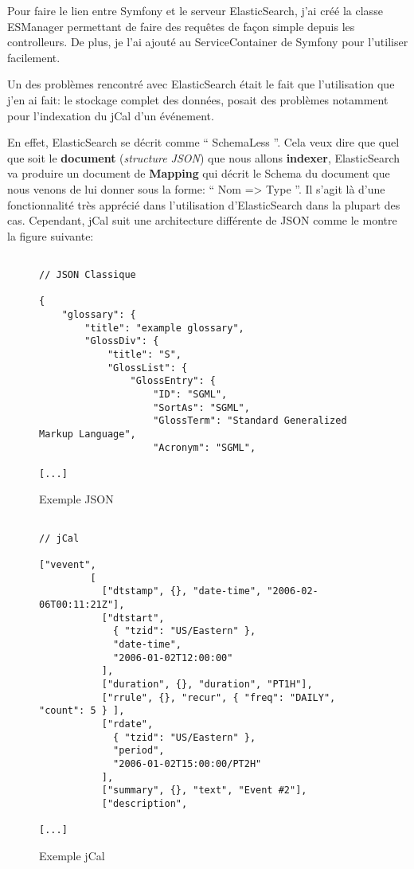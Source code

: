 Pour faire le lien entre Symfony et le serveur ElasticSearch, j'ai créé la classe ESManager permettant de faire des requêtes de façon simple depuis les controlleurs. De plus, je l'ai ajouté au ServiceContainer de Symfony pour l'utiliser facilement.

Un des problèmes rencontré avec ElasticSearch était le fait que l'utilisation que j'en ai fait: le stockage complet des données, posait des problèmes notamment pour l'indexation du jCal d'un événement.

En effet, ElasticSearch se décrit comme `` SchemaLess ''. Cela veux dire que quel que soit le \textbf{document} (\textit{structure JSON}) que nous allons \textbf{indexer}, ElasticSearch va produire un document de \textbf{Mapping} qui décrit le Schema du document que nous venons de lui donner sous la forme: `` Nom => Type ''. Il s'agit là d'une fonctionnalité très apprécié dans l'utilisation d'ElasticSearch dans la plupart des cas. Cependant, jCal suit une architecture différente de JSON comme le montre la figure suivante:

\begin{figure}[h]
\begin{lstlisting}[frame=single]

// JSON Classique

{
    "glossary": {
        "title": "example glossary",
        "GlossDiv": {
            "title": "S",
            "GlossList": {
                "GlossEntry": {
                    "ID": "SGML",
                    "SortAs": "SGML",
                    "GlossTerm": "Standard Generalized Markup Language",
                    "Acronym": "SGML",

[...]

\end{lstlisting}
\caption{Exemple JSON}
\end{figure}

\newpage

\begin{figure}[h]
\begin{lstlisting}[frame=single]

// jCal

["vevent",
         [
           ["dtstamp", {}, "date-time", "2006-02-06T00:11:21Z"],
           ["dtstart",
             { "tzid": "US/Eastern" },
             "date-time",
             "2006-01-02T12:00:00"
           ],
           ["duration", {}, "duration", "PT1H"],
           ["rrule", {}, "recur", { "freq": "DAILY", "count": 5 } ],
           ["rdate",
             { "tzid": "US/Eastern" },
             "period",
             "2006-01-02T15:00:00/PT2H"
           ],
           ["summary", {}, "text", "Event #2"],
           ["description",

[...]

\end{lstlisting}
\caption{Exemple jCal}
\end{figure}

